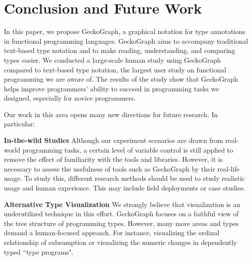 \section{Conclusion and Future Work}
In this paper, we propose GeckoGraph, a graphical notation for type annotations in functional programming languages. GeckoGraph aims to accompany traditional text-based type notation and to make reading, understanding, and comparing types easier. We conducted a large-scale human study using GeckoGraph compared to text-based type notation, the largest user study on functional programming we are aware of. The results of the study show that GeckoGraph helps improve programmers' ability to succeed in programming tasks we designed, especially for novice programmers.

Our work in this area opens many new directions for future research.  In particular:

\noindent\textbf{In-the-wild Studies}
Although our experiment scenarios are drawn from real-world programming tasks, a certain level of variable control is still applied to remove the effect of familiarity with the tools and libraries. However, it is necessary to assess the usefulness of tools such as GeckoGraph by their real-life usage. To study this, different research methods should be used to study realistic usage and human experience. This may include field deployments or case studies. 

\noindent\textbf{Alternative Type Visualization}
We strongly believe that visualization is an underutilized technique in this effort. GeckoGraph focuses on a faithful view of the tree structure of programming types. However, many more areas and types demand a human-focused approach. For instance, visualizing the ordinal relationship of subsumption or visualizing the numeric changes in dependently typed ``type programs". 

